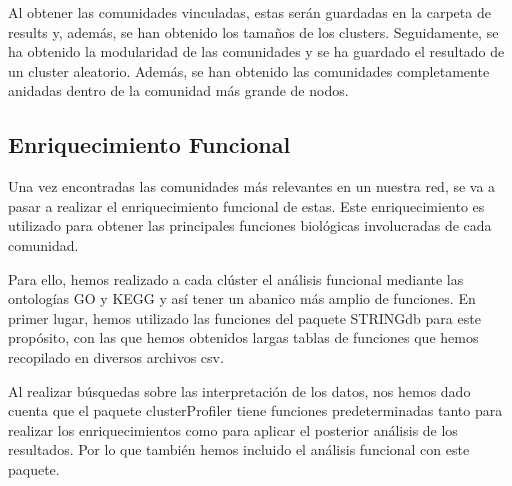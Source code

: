 Al obtener las comunidades vinculadas, estas serán guardadas en la carpeta de results y, además, se han obtenido los tamaños de los clusters. Seguidamente, se ha obtenido la modularidad de las comunidades y se ha guardado el resultado de un cluster aleatorio.
Además, se han obtenido las comunidades completamente anidadas dentro de la comunidad más grande de nodos.

\subsection{Enriquecimiento Funcional}
Una vez encontradas las comunidades más relevantes en un nuestra red, se va a pasar a realizar el enriquecimiento funcional de estas. Este enriquecimiento es utilizado para obtener las principales funciones biológicas involucradas de cada comunidad.

Para ello, hemos realizado a cada clúster el análisis funcional mediante las ontologías GO y KEGG y así tener un abanico más amplio de funciones. En primer lugar, 
hemos utilizado las funciones del paquete STRINGdb para este propósito, con las que hemos obtenidos largas tablas de funciones que hemos recopilado en diversos archivos csv.

Al realizar búsquedas sobre las interpretación de los datos, nos hemos dado cuenta que el paquete clusterProfiler tiene funciones predeterminadas tanto para realizar los enriquecimientos como para aplicar el posterior análisis de los resultados. Por lo que también hemos incluido el análisis funcional con este paquete.

 